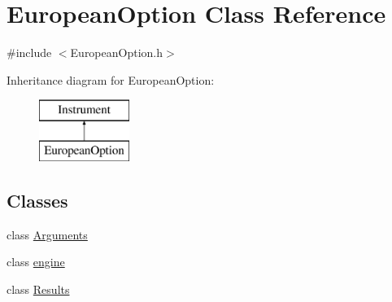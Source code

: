 \hypertarget{class_european_option}{}\section{European\+Option Class Reference}
\label{class_european_option}


{\ttfamily \#include $<$European\+Option.\+h$>$}

Inheritance diagram for European\+Option\+:\begin{figure}[H]
\begin{center}
\leavevmode
\includegraphics[height=2.000000cm]{class_european_option}
\end{center}
\end{figure}
\subsection*{Classes}
\begin{DoxyCompactItemize}
\item 
class \hyperlink{class_european_option_1_1_arguments}{Arguments}
\item 
class \hyperlink{class_european_option_1_1engine}{engine}
\item 
class \hyperlink{class_european_option_1_1_results}{Results}
\end{DoxyCompactItemize}
